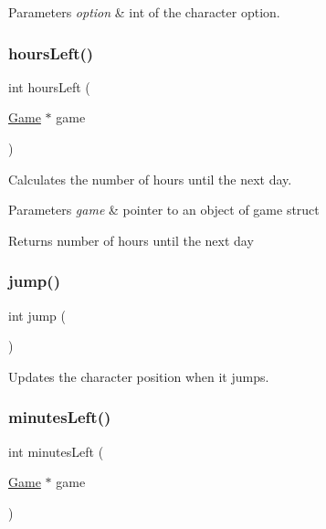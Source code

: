 \begin{DoxyParams}{Parameters}
{\em option} & int of the character option. \\
\hline
\end{DoxyParams}
\mbox{\label{group___graphics_gaa4e1ad5e2668cefab925f9151e82cf56}} 
\subsubsection{\texorpdfstring{hours\+Left()}{hoursLeft()}}
{\footnotesize\ttfamily int hours\+Left (\begin{DoxyParamCaption}\item[{\hyperlink{struct_game}{Game} $\ast$}]{game }\end{DoxyParamCaption})}



Calculates the number of hours until the next day. 


\begin{DoxyParams}{Parameters}
{\em game} & pointer to an object of game struct \\
\hline
\end{DoxyParams}
\begin{DoxyReturn}{Returns}
number of hours until the next day 
\end{DoxyReturn}
\mbox{\label{group___graphics_ga307c4ac67d1d0316a5e01620930504c5}} 
\subsubsection{\texorpdfstring{jump()}{jump()}}
{\footnotesize\ttfamily int jump (\begin{DoxyParamCaption}{ }\end{DoxyParamCaption})}



Updates the character position when it jumps. 

\mbox{\label{group___graphics_ga9c96c725c4779f2b277be96d399752c0}} 
\subsubsection{\texorpdfstring{minutes\+Left()}{minutesLeft()}}
{\footnotesize\ttfamily int minutes\+Left (\begin{DoxyParamCaption}\item[{\hyperlink{struct_game}{Game} $\ast$}]{game }\end{DoxyParamCaption})}



